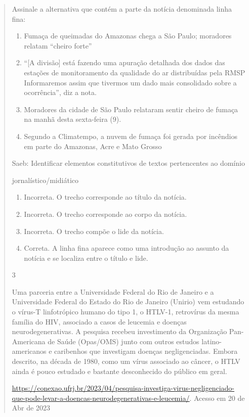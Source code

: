 {\begin{quote}
{\begin{itemize}
\begin{itemize}
Assinale a alternativa que contém a parte da notícia denominada linha
fina:

\begin{enumerate}

\item
  Fumaça de queimadas do Amazonas chega a São Paulo; moradores relatam
  ``cheiro forte''
\item
  ``{[}A divisão{]} está fazendo uma apuração detalhada dos dados das
  estações de monitoramento da qualidade do ar distribuídas pela RMSP
  Informaremos assim que tivermos um dado mais consolidado sobre a
  ocorrência'', diz a nota.
\item
  Moradores da cidade de São Paulo relataram sentir cheiro de fumaça na
  manhã desta sexta-feira (9).
\item
  Segundo a Climatempo, a nuvem de fumaça foi gerada por incêndios em
  parte do Amazonas, Acre e Mato Grosso
\end{enumerate}

Saeb: Identificar elementos constitutivos de textos pertencentes ao
domínio

jornalístico/midiático

\begin{enumerate}
\def\labelenumi{\arabic{enumi}.}
\item
  Incorreta. O trecho corresponde ao título da notícia.
\item
  Incorreta. O trecho corresponde ao corpo da notícia.
\item
  Incorreta. O trecho compõe o lide da notícia.
\item
  Correta. A linha fina aparece como uma introdução ao assunto da
  notícia e se localiza entre o título e lide.
\end{enumerate}

\num{3}

Uma parceria entre a Universidade Federal do Rio de Janeiro e a
Universidade Federal do Estado do Rio de Janeiro (Unirio) vem estudando
o vírus-T linfotrópico humano do tipo 1, o HTLV-1, retrovírus da mesma
família do HIV, associado a casos de leucemia e doenças
neurodegenerativas. A pesquisa recebeu investimento da Organização
Pan-Americana de Saúde (Opas/OMS) junto com outros estudos
latino-americanos e caribenhos que investigam doenças negligenciadas.
Embora descrito, na década de 1980, como um vírus associado ao câncer, o
HTLV ainda é pouco estudado e bastante desconhecido do público em geral.

\href{https://conexao.ufrj.br/2023/04/pesquisa-investiga-virus-negligenciado-que-pode-levar-a-doencas-neurodegenerativas-e-leucemia/}{\uline{https://conexao.ufrj.br/2023/04/pesquisa-investiga-virus-negligenciado-que-pode-levar-a-doencas-neurodegenerativas-e-leucemia/}}.
Acesso em 20 de Abr de 2023


\end{itemize}
\end{itemize}}
\end{quote}}
